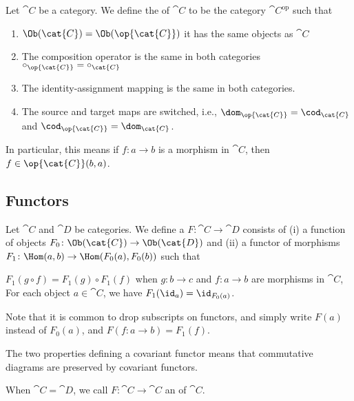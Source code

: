 \begin{example}

\end{example}

\begin{definition}
Let $\cat{C}$ be a category. We define the  of
$\cat{C}$ to be the category $\cat{C}^{\text{op}}$ such that
\begin{enumerate}
\item $\Ob(\cat{C})=\Ob(\op{\cat{C}})$ it has the same objects as $\cat{C}$
\item The composition operator is the same in both categories $\circ_{\op{\cat{C}}}=\circ_{\cat{C}}$
\item The identity-assignment mapping is the same in both categories.
\item The source and target maps are switched, i.e.,
  $\dom_{\op{\cat{C}}}=\cod_{\cat{C}}$ and $\cod_{\op{\cat{C}}}=\dom_{\cat{C}}$.
\end{enumerate}
In particular, this means if $f\colon a\to b$ is a morphism in
$\cat{C}$, then $f\in\op{\cat{C}}(b,a)$.
\end{definition}

\subsection{Functors}

\begin{definition}
Let $\cat{C}$ and $\cat{D}$ be categories.
We define a  $F\colon\cat{C}\to\cat{D}$
consists of (i) a function of objects $F_{0}\colon\Ob(\cat{C})\to\Ob(\cat{D})$ 
and (ii) a functor of morphisms $F_{1}\colon\Hom(a,b)\to\Hom(F_{0}(a),F_{0}(b))$
such that
\begin{itemize}
 $F_{1}(g\circ f)=F_{1}(g)\circ F_{1}(f)$
when $g\colon b\to c$ and $f\colon a\to b$ are morphisms in $\cat{C}$,
 For each object $a\in\cat{C}$,
we have $F_{1}(\id_{a})=\id_{F_{0}(a)}$.
\end{itemize}
Note that it is common to drop subscripts on functors, and simply
write $F(a)$ instead of $F_{0}(a)$, and $F(f\colon a\to b) = F_{1}(f)$.

The two properties defining a covariant functor means that commutative
diagrams are preserved by covariant functors.

When $\cat{C}=\cat{D}$, we call $F\colon\cat{C}\to\cat{C}$ an
 of $\cat{C}$.
\end{definition}

